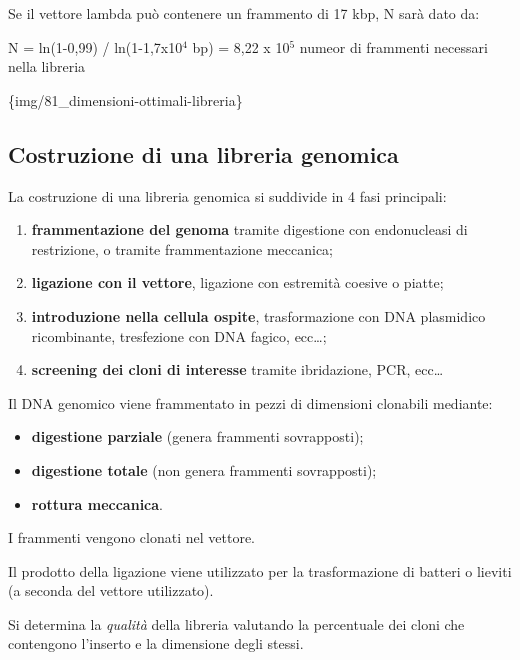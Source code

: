 \documentclass[]{article}
\begin{document}
Se il vettore lambda può contenere un frammento di 17 kbp, N sarà dato
da:

N = ln(1-0,99) / ln(1-1,7x10\(^4\) bp) = 8,22 x 10\(^5\) numeor di
frammenti necessari nella libreria

\{img/81\_dimensioni-ottimali-libreria\}

\subsection{Costruzione di una libreria
genomica}\label{costruzione-di-una-libreria-genomica}

La costruzione di una libreria genomica si suddivide in 4 fasi
principali:

\begin{enumerate}
\def\labelenumi{\arabic{enumi}.}
\itemsep1pt\parskip0pt
\item
  \textbf{frammentazione del genoma} tramite digestione con endonucleasi
  di restrizione, o tramite frammentazione meccanica;
\item
  \textbf{ligazione con il vettore}, ligazione con estremità coesive o
  piatte;
\item
  \textbf{introduzione nella cellula ospite}, trasformazione con DNA
  plasmidico ricombinante, tresfezione con DNA fagico, ecc\ldots{};
\item
  \textbf{screening dei cloni di interesse} tramite ibridazione, PCR,
  ecc\ldots{}
\end{enumerate}

Il DNA genomico viene frammentato in pezzi di dimensioni clonabili
mediante:

\begin{itemize}
\itemsep1pt\parskip0pt
\item
  \textbf{digestione parziale} (genera frammenti sovrapposti);
\item
  \textbf{digestione totale} (non genera frammenti sovrapposti);
\item
  \textbf{rottura meccanica}.
\end{itemize}

I frammenti vengono clonati nel vettore.

Il prodotto della ligazione viene utilizzato per la trasformazione di
batteri o lieviti (a seconda del vettore utilizzato).

Si determina la \emph{qualità} della libreria valutando la percentuale
dei cloni che contengono l'inserto e la dimensione degli stessi.
\end{document}
